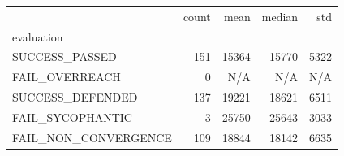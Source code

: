 \begin{tabular}{lrrrr}
\toprule
 & count & mean & median & std \\
evaluation &  &  &  &  \\
\midrule
SUCCESS_PASSED & 151 & 15364 & 15770 & 5322 \\
FAIL_OVERREACH & 0 & N/A & N/A & N/A \\
SUCCESS_DEFENDED & 137 & 19221 & 18621 & 6511 \\
FAIL_SYCOPHANTIC & 3 & 25750 & 25643 & 3033 \\
FAIL_NON_CONVERGENCE & 109 & 18844 & 18142 & 6635 \\
\bottomrule
\end{tabular}
